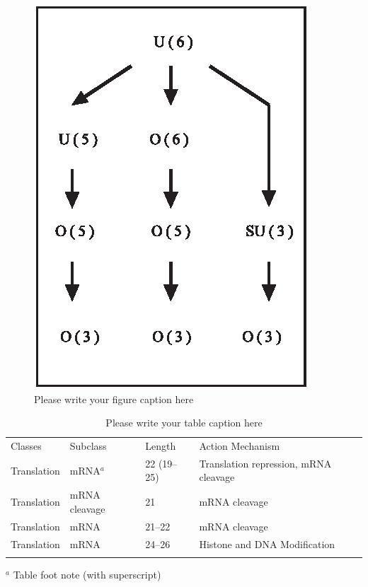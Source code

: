 %
\begin{figure}[t]
\sidecaption[t]
\includegraphics[scale=.65]{editorial/assets/figure}
%
%
\caption{Please write your figure caption here}
\label{appendix:fig:1}
\end{figure}

%
\begin{table}
\caption{Please write your table caption here}
\label{appendix:table:1}       %
%
%
\begin{tabular}{p{2cm}p{2.4cm}p{2cm}p{4.9cm}}
\hline\noalign{\smallskip}
Classes & Subclass & Length & Action Mechanism  \\
\noalign{\smallskip}\hline\noalign{\smallskip}
Translation & mRNA$^a$  & 22 (19--25) & Translation repression, mRNA cleavage\\
Translation & mRNA cleavage & 21 & mRNA cleavage\\
Translation & mRNA  & 21--22 & mRNA cleavage\\
Translation & mRNA  & 24--26 & Histone and DNA Modification\\
\noalign{\smallskip}\hline\noalign{\smallskip}
\end{tabular}
$^a$ Table foot note (with superscript)
\end{table}
%
